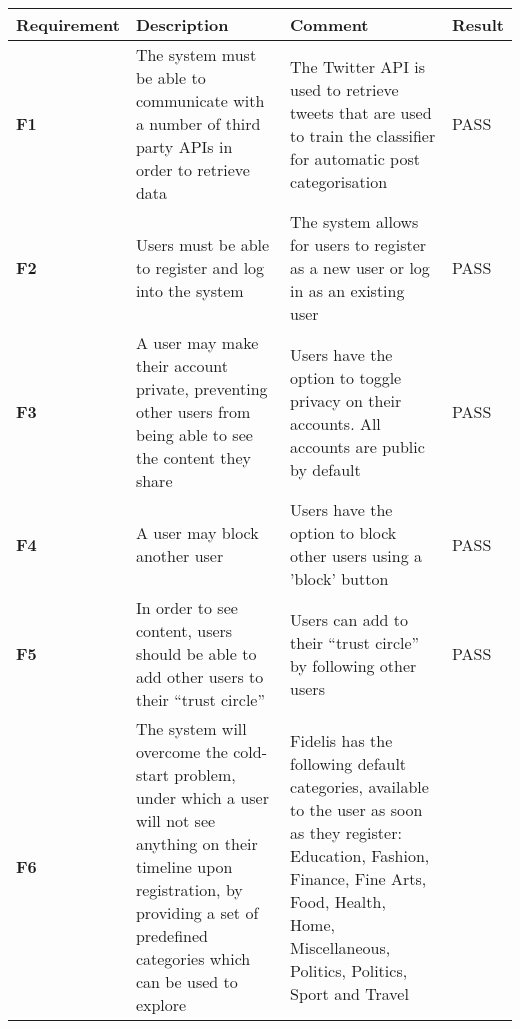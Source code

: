 \begin{longtabu} to \textwidth {XXXX}
\hline
Requirement & Description                                                                                                                                                                                                        & Comment                                                                                       & Result                      \\ \hline
\textbf{F1}          & The system must be able to communicate with a number of third party APIs in order to retrieve data                                                                                                                 & The Twitter API is used to retrieve tweets that are used to train the classifier for automatic post categorisation                                                           & {\color[HTML]{34FF34} PASS} \\
\textbf{F2}          & Users must be able to register and log into the system                                                                                                                                                             & The system allows for users to register as a new user or log in as an existing user           & {\color[HTML]{34FF34} PASS} \\
\textbf{F3}          & A user may make their account private, preventing other users from being able to see the content they share                                                                                                        & Users have the option to toggle privacy on their accounts. All accounts are public by default & {\color[HTML]{34FF34} PASS} \\
\textbf{F4}          & A user may block another user                                                                                                                                                                                      & Users have the option to block other users using a 'block' button                             & {\color[HTML]{34FF34} PASS} \\
\textbf{F5}          & In order to see content, users should be able to add other users to their ``trust circle''                                                                                                                         & Users can add to their ``trust circle'' by following other users                              & {\color[HTML]{34FF34} PASS} \\
\textbf{F6}          & The system will overcome the cold-start problem, under which a user will not see anything on their timeline upon registration, by providing a set of predefined categories which can be used to explore            &                                                                                            Fidelis has the following default categories, available to the user as soon as they register: Education, Fashion, Finance, Fine Arts, Food, Health, Home, Miscellaneous, Politics, Politics, Sport and Travel

\end{longtabu}
